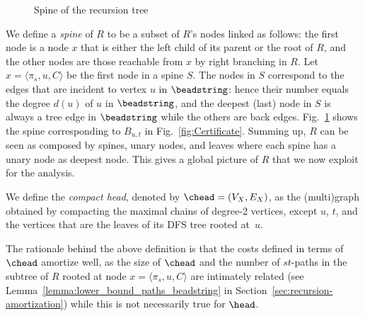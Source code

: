 \begin{figure}[t]
	\centering
{}
\caption{Spine of the recursion tree \label{fig:spine}}
\end{figure}
We define a \emph{spine} of $R$ to be a subset of $R$'s nodes linked
as follows: the first node is a node $x$ that is either the left child
of its parent or the root of $R$, and the other nodes are those
reachable from $x$ by right branching in $R$. Let $x = \langle \pi_s,
u, C \rangle$ be the first node in a spine $S$. The nodes in $S$
correspond to the edges that are incident to vertex $u$ in
$\beadstring$: hence their number equals the degree $d(u)$ of $u$ in
$\beadstring$, and the deepest (last) node in $S$ is always a tree
edge in $\beadstring$ while the others are back edges.
Fig.~\ref{fig:spine} shows the spine corresponding to $B_{u,t}$ in
Fig.~\ref{fig:Certificate}. Summing up, $R$ can be seen as composed by
spines, unary nodes, and leaves where each spine has a unary node as
deepest node. This gives a global picture of $R$ that we now exploit
for the analysis.



We define the \emph{compact head}, denoted by \mbox{$\chead = (V_X,
E_X)$}, as the (multi)graph obtained by compacting the maximal chains
of degree-2 vertices, except $u$, $t$, and the vertices that are the
leaves of its DFS tree rooted at~$u$.

The rationale behind the above definition is that the costs defined in
terms of $\chead$ amortize well, as the size of $\chead$ and the
number of $st$-paths in the subtree of $R$ rooted at node $x = \langle
\pi_s, u, C \rangle$ are intimately related (see
Lemma~\ref{lemma:lower_bound_paths_beadstring} in
Section~\ref{sec:recursion-amortization}) while this is not
necessarily true for $\head$.

